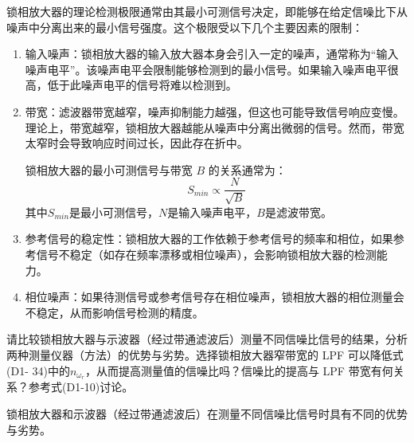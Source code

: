 \documentclass[dvipsnames, svgnames,a4paper,11pt]{article}
\begin{document}
	锁相放大器的理论检测极限通常由其最小可测信号决定，即能够在给定信噪比下从噪声中分离出来的最小信号强度。这个极限受以下几个主要因素的限制：
	\begin{enumerate}
		\item 输入噪声：锁相放大器的输入放大器本身会引入一定的噪声，通常称为“输入噪声电平”。该噪声电平会限制能够检测到的最小信号。如果输入噪声电平很高，低于此噪声电平的信号将难以检测到。
		\item 带宽：滤波器带宽越窄，噪声抑制能力越强，但这也可能导致信号响应变慢。理论上，带宽越窄，锁相放大器越能从噪声中分离出微弱的信号。然而，带宽太窄时会导致响应时间过长，因此存在折中。
		
		锁相放大器的最小可测信号与带宽 $B$ 的关系通常为：
		\[
			S_{min} \propto \frac{N}{\sqrt{B}}
		\]
		其中$S_{min}$是最小可测信号，$N$是输入噪声电平，$B$是滤波带宽。

		\item 参考信号的稳定性：锁相放大器的工作依赖于参考信号的频率和相位，如果参考信号不稳定（如存在频率漂移或相位噪声），会影响锁相放大器的检测能力。
		\item 相位噪声：如果待测信号或参考信号存在相位噪声，锁相放大器的相位测量会不稳定，从而影响信号检测的精度。
	\end{enumerate}




\begin{question}
	请比较锁相放大器与示波器（经过带通滤波后）测量不同信噪比信号的结果，分析两种测量仪器（方法）的优势与劣势。选择锁相放大器窄带宽的 LPF 可以降低式(D1- 34)中的$n_{\omega_r}$，从而提高测量值的信噪比吗？信噪比的提高与 LPF 带宽有何关系？参考式(D1-10)讨论。
\end{question}

	锁相放大器和示波器（经过带通滤波后）在测量不同信噪比信号时具有不同的优势与劣势。
\end{document}
